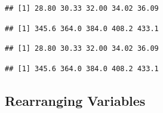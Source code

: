 \documentclass[
]{krantz}
\newenvironment{Shaded}{\begin{snugshade}}{\end{snugshade}}
\newcommand{\DecValTok}[1]{\textcolor[rgb]{0.00,0.00,0.81}{#1}}
\newcommand{\KeywordTok}[1]{\textcolor[rgb]{0.13,0.29,0.53}{\textbf{#1}}}
\newcommand{\NormalTok}[1]{#1}
\newcommand{\OperatorTok}[1]{\textcolor[rgb]{0.81,0.36,0.00}{\textbf{#1}}}
\newcommand{\StringTok}[1]{\textcolor[rgb]{0.31,0.60,0.02}{#1}}
\begin{document}
\begin{verbatim}
## [1] 28.80 30.33 32.00 34.02 36.09
\end{verbatim}

\begin{Shaded}
\end{Shaded}

\begin{verbatim}
## [1] 345.6 364.0 384.0 408.2 433.1
\end{verbatim}

\begin{Shaded}
\end{Shaded}

\begin{verbatim}
## [1] 28.80 30.33 32.00 34.02 36.09
\end{verbatim}

\begin{Shaded}
\end{Shaded}

\begin{verbatim}
## [1] 345.6 364.0 384.0 408.2 433.1
\end{verbatim}

\hypertarget{rearranging-variables}{%
\subsection{Rearranging Variables}\label{rearranging-variables}}
\end{document}
